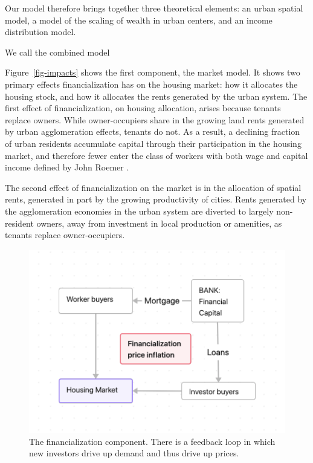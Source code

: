 Our model therefore brings together three theoretical elements: an urban spatial model,  a model of the scaling of wealth in urban centers, and an income distribution model. %

We call the combined model %

Figure~\ref{fig-impacts} shows the first component, the market model.
It shows two primary effects financialization has on the housing market: how it allocates
the housing stock, and how it allocates the \glspl{rent} generated by the urban system. 
The first effect of financialization, on housing allocation, arises because tenants replace owners. While owner-occupiers share in the growing land rents generated by urban agglomeration effects, tenants do not. As a result, a declining fraction of urban residents accumulate capital through their participation in the housing market, and therefore fewer enter the class of workers with both wage and capital income defined by John Roemer \cite{roemerGeneralTheoryExploitation1982}. 

The second effect of financialization on the market is in the allocation of spatial rents, generated in part by the growing productivity of cities. Rents generated by the \gls{agglomeration} economies in the urban system are diverted to largely non-resident owners, away from investment in local production or amenities, as tenants replace owner-occupiers.

\begin{figure}[!ht]
\centering
\includegraphics[scale=.70]{fig/flow-financialization.png}
\caption[The financialization component of the model.]{The financialization component. There is a feedback loop in which new investors drive up demand and thus drive up prices.}
\label{fig-financial-cycle}
\end{figure}

